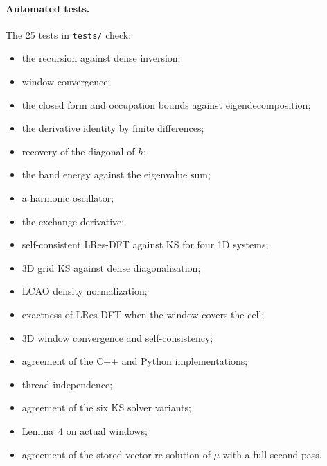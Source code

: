 \documentclass[aps,prb,onecolumn,superscriptaddress,floatfix]{revtex4-2}
\begin{document}
\paragraph*{Automated tests.} The 25 tests in \texttt{tests/} check:
\begin{itemize}
\item the recursion against dense inversion;
\item window convergence;
\item the closed form and occupation bounds against eigendecomposition;
\item the derivative identity by finite differences;
\item recovery of the diagonal of $h$;
\item the band energy against the eigenvalue sum;
\item a harmonic oscillator;
\item the exchange derivative;
\item self-consistent LRes-DFT against KS for four 1D systems;
\item 3D grid KS against dense diagonalization;
\item LCAO density normalization;
\item exactness of LRes-DFT when the window covers the cell;
\item 3D window convergence and self-consistency;
\item agreement of the C++ and Python implementations;
\item thread independence;
\item agreement of the six KS solver variants;
\item Lemma~4 on actual windows;
\item agreement of the stored-vector re-solution of $\mu$ with a full second pass.
\end{itemize}
\end{document}
